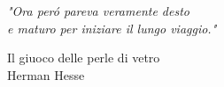 {
\thispagestyle{empty}

\linespread{1}   


\vspace*{3cm}
\hskip5cm\parbox[t]{10cm}
{\large\begin{flushright}
{
\textit{"Ora per\'o pareva veramente desto\\
 e maturo per iniziare il lungo viaggio."}\\}
\end{flushright}
 \small \begin{flushright}
 Il giuoco delle perle di vetro\\
 Herman Hesse
 \end{flushright}
}


%

\linespread{\Mylinespacing}   
\newpage
\newpage
\thispagestyle{empty}
\clearpage
}

